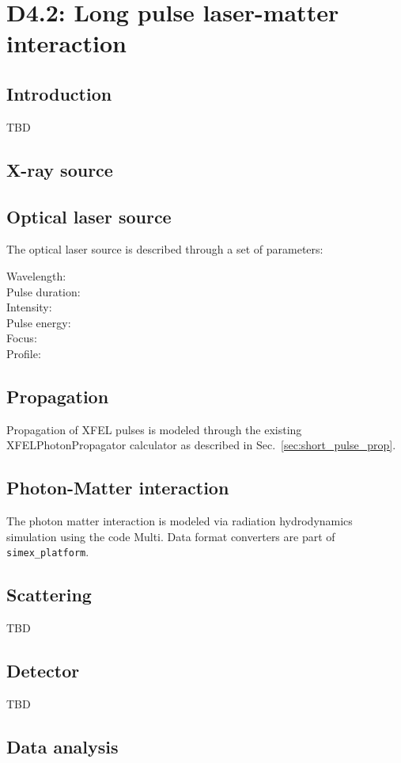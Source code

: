 \documentclass[a4paper]{article}
\begin{document}
\section{D4.2: Long pulse laser-matter interaction\label{sec:long_pulse}}
\subsection{Introduction}
TBD
\subsection{X-ray source}
\subsection{Optical laser source}
The optical laser source is described through a set of parameters:
\begin{description}
  \item[Wavelength:]
  \item[Pulse duration:]
  \item[Intensity:]
  \item[Pulse energy:]
  \item[Focus:]
  \item[Profile:]
\end{description}
\subsection{Propagation}
Propagation of XFEL pulses is modeled through the existing XFELPhotonPropagator calculator as described in Sec.~\ref{sec:short_pulse_prop}.
\subsection{Photon-Matter interaction}
The photon matter interaction is modeled via radiation hydrodynamics simulation using the code Multi. Data format converters are part of
\texttt{simex\_platform}.
\subsection{Scattering}
TBD
\subsection{Detector}
TBD
\subsection{Data analysis}

\printbibliography
\end{document}
